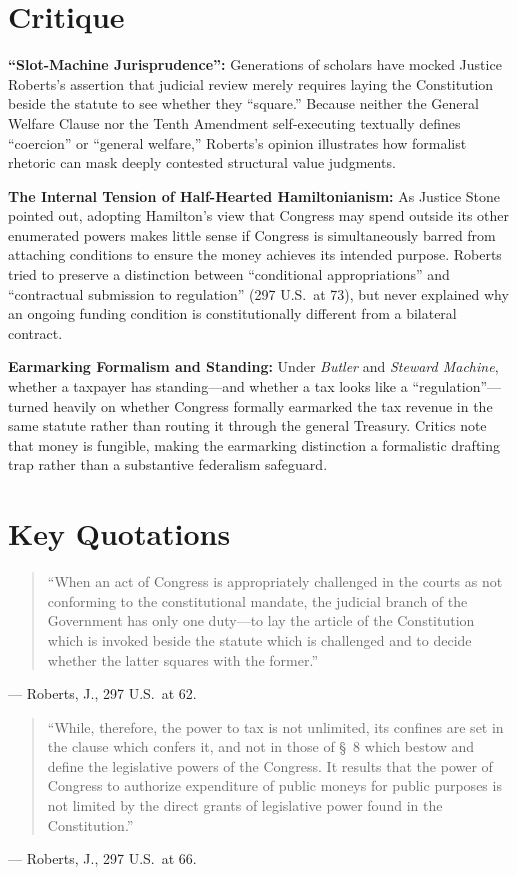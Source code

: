\documentclass[12pt]{article}
\begin{document}
\section{Critique}
\textbf{``Slot-Machine Jurisprudence'':} Generations of scholars have mocked Justice Roberts's assertion that judicial review merely requires laying the Constitution beside the statute to see whether they ``square.'' Because neither the General Welfare Clause nor the Tenth Amendment self-executing textually defines ``coercion'' or ``general welfare,'' Roberts's opinion illustrates how formalist rhetoric can mask deeply contested structural value judgments.

\textbf{The Internal Tension of Half-Hearted Hamiltonianism:} As Justice Stone pointed out, adopting Hamilton's view that Congress may spend outside its other enumerated powers makes little sense if Congress is simultaneously barred from attaching conditions to ensure the money achieves its intended purpose. Roberts tried to preserve a distinction between ``conditional appropriations'' and ``contractual submission to regulation'' (297 U.S.\ at 73), but never explained why an ongoing funding condition is constitutionally different from a bilateral contract.

\textbf{Earmarking Formalism and Standing:} Under \textit{Butler} and \textit{Steward Machine}, whether a taxpayer has standing---and whether a tax looks like a ``regulation''---turned heavily on whether Congress formally earmarked the tax revenue in the same statute rather than routing it through the general Treasury. Critics note that money is fungible, making the earmarking distinction a formalistic drafting trap rather than a substantive federalism safeguard.

\section{Key Quotations}
\begin{quote}
``When an act of Congress is appropriately challenged in the courts as not conforming to the constitutional mandate, the judicial branch of the Government has only one duty---to lay the article of the Constitution which is invoked beside the statute which is challenged and to decide whether the latter squares with the former.''
\end{quote}
\noindent --- Roberts, J., 297 U.S.\ at 62.

\begin{quote}
``While, therefore, the power to tax is not unlimited, its confines are set in the clause which confers it, and not in those of \S\ 8 which bestow and define the legislative powers of the Congress. It results that the power of Congress to authorize expenditure of public moneys for public purposes is not limited by the direct grants of legislative power found in the Constitution.''
\end{quote}
\noindent --- Roberts, J., 297 U.S.\ at 66.
\end{document}
